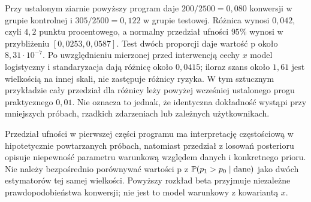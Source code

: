 \begin{przyklad}
Przy ustalonym ziarnie powyższy program daje $200/2500=0{,}080$ konwersji w grupie kontrolnej i $305/2500=0{,}122$ w grupie testowej. Różnica wynosi $0{,}042$, czyli $4{,}2$ punktu procentowego, a normalny przedział ufności $95\%$ wynosi w przybliżeniu $[0{,}0253,0{,}0587]$. Test dwóch proporcji daje wartość p około $8{,}31\cdot10^{-7}$. Po uwzględnieniu mierzonej przed interwencją cechy $x$ model logistyczny i standaryzacja dają różnicę około $0{,}0415$; iloraz szans około $1{,}61$ jest wielkością na innej skali, nie zastępuje różnicy ryzyka. W tym sztucznym przykładzie cały przedział dla różnicy leży powyżej wcześniej ustalonego progu praktycznego $0{,}01$. Nie oznacza to jednak, że identyczna dokładność wystąpi przy mniejszych próbach, rzadkich zdarzeniach lub zależnych użytkownikach.
\end{przyklad}

\begin{uwaga}
Przedział ufności w pierwszej części programu ma interpretację częstościową w hipotetycznie powtarzanych próbach, natomiast przedział z losowań posterioru opisuje niepewność parametru warunkową względem danych i konkretnego prioru. Nie należy bezpośrednio porównywać wartości p z $\mathbb P(p_1>p_0\mid\text{dane})$ jako dwóch estymatorów tej samej wielkości. Powyższy rozkład beta przyjmuje niezależne prawdopodobieństwa konwersji; nie jest to model warunkowy z kowariantą $x$.
\end{uwaga}

